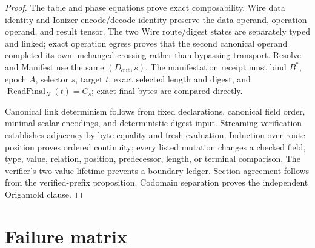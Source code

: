 \documentclass[11pt,letterpaper]{article}
\theoremstyle{definition}
\begin{document}
\begin{proof}
The table and phase equations prove exact composability.  Wire data identity
and Ionizer encode/decode identity preserve the data operand, operation
operand, and result tensor.  The two Wire route/digest states are separately
typed and linked; exact operation egress proves that the second canonical
operand completed its own unchanged crossing rather than bypassing transport.
Resolve and Manifest use the same $(D_{\mathrm{out}},s)$.  The manifestation
 receipt must bind $B^*$, epoch $A$, selector $s$, target $t$, exact selected length and
digest, and $\operatorname{ReadFinal}_N(t)=C_s$; exact final bytes are
compared directly.

Canonical link determinism follows from fixed declarations, canonical field
order, minimal scalar encodings, and deterministic digest input.  Streaming
verification establishes adjacency by byte equality and fresh evaluation.
Induction over route position proves ordered continuity; every listed mutation
changes a checked field, type, value, relation, position, predecessor, length,
or terminal comparison.  The verifier's two-value lifetime prevents a
boundary ledger.  Section agreement follows from the verified-prefix
proposition.  Codomain separation proves the independent Origamold clause.
\end{proof}

\section{Failure matrix}
\end{document}

